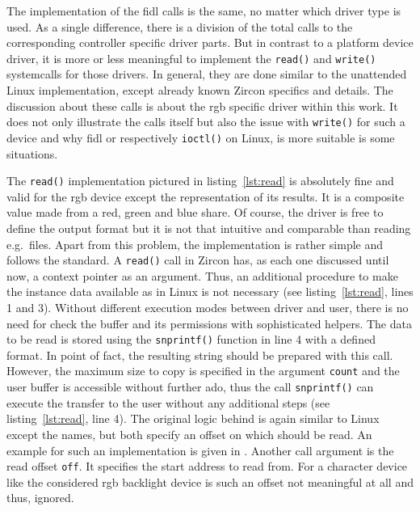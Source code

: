 %
The implementation of the \ac{fidl} calls is the same, no matter which driver type is used.
As a single difference, there is a division of the total calls to the corresponding controller specific driver parts.
But in contrast to a platform device driver, it is more or less meaningful to implement the \texttt{read()} and \texttt{write()} systemcalls for those drivers.
In general, they are done similar to the unattended Linux implementation, except already known Zircon specifics and details.
The discussion about these calls is about the \ac{rgb} specific driver within this work.
It does not only illustrate the calls itself but also the issue with \texttt{write()} for such a device and why \ac{fidl} or respectively \texttt{ioctl()} on Linux, is more suitable is some situations.

The \texttt{read()} implementation pictured in listing~\ref{lst:read} is absolutely fine and valid for the \ac{rgb} device except the representation of its results.
It is a composite value made from a red, green and blue share.
Of course, the driver is free to define the output format but it is not that intuitive and comparable than reading e.g.\ files.
Apart from this problem, the implementation is rather simple and follows the standard.
A \texttt{read()} call in Zircon has, as each one discussed until now, a context pointer as an argument.
Thus, an additional procedure to make the instance data available as in Linux is not necessary (see listing~\ref{lst:read}, lines 1 and 3).
Without different execution modes between driver and user, there is no need for check the buffer and its permissions with sophisticated helpers.
The data to be read is stored using the \texttt{snprintf()} function in line 4 with a defined format.
In point of fact, the resulting string should be prepared with this call.
However, the maximum size to copy is specified in the argument \texttt{count} and the user buffer is accessible without further ado, thus the call \texttt{snprintf()} can execute the transfer to the user without any additional steps (see listing~\ref{lst:read}, line 4).
The original logic behind is again similar to Linux except the names, but both specify an offset on which should be read.
An example for such an implementation is given in \cite{zircon-simpledrv}.
Another call argument is the read offset \texttt{off}.
It specifies the start address to read from.
For a character device like the considered \ac{rgb} backlight device is such an offset not meaningful at all and thus, ignored.
